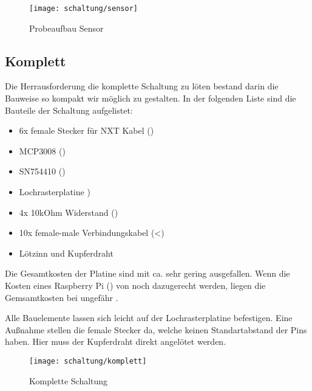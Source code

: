 \begin{figure}[h]
  \centering
  \texttt{[image: schaltung/sensor]}
  \caption{Probeaufbau Sensor}
  \label{schaltung:sensor}
\end{figure}

\subsection{Komplett}

Die Herrausforderung die komplette Schaltung zu löten bestand darin die Bauweise so kompakt wir möglich zu gestalten. In der folgenden Liste sind die Bauteile der Schaltung aufgelistet:

\begin{itemize}
  \item 6x female Stecker für NXT Kabel ()
  \item MCP3008 ()
  \item SN754410 ()
  \item Lochrasterplatine )
  \item 4x 10kOhm Widerstand ()
  \item 10x female-male Verbindungskabel (<)
  \item Lötzinn und Kupferdraht
\end{itemize}

Die Gesamtkosten der Platine sind mit ca.  sehr gering ausgefallen. Wenn die Kosten eines Raspberry Pi () von noch dazugerecht werden, liegen die Gemsamtkosten bei ungefähr .

Alle Bauelemente lassen sich leicht auf der Lochrasterplatine befestigen. Eine Außnahme stellen die female Stecker da, welche keinen Standartabstand der Pins haben. Hier muss der Kupferdraht direkt angelötet werden.

\begin{figure}[h]
  \centering
  \texttt{[image: schaltung/komplett]}
  \caption{Komplette Schaltung}
  \label{schaltung:komplett}
\end{figure}
